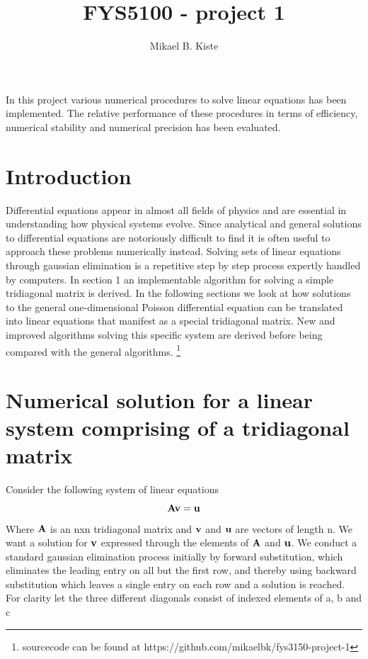 \documentclass[10pt,a4paper]{article}
\author{Mikael B. Kiste}
\title{FYS5100 - project 1}
\begin{document}
    \maketitle

    \abstract In this project various numerical procedures to solve linear equations has been implemented. The relative performance of these procedures in terms of efficiency, numerical stability and numerical precision has been evaluated.

    \tableofcontents

    \newpage
    \section{Introduction}
    Differential equations appear in almost all fields of physics and are essential in understanding how physical systems evolve. Since analytical and general solutions to differential equations are notoriously difficult to find it is often useful to approach these problems numerically instead. Solving sets of linear equations through gaussian elimination is a repetitive step by step process expertly handled by computers. In section 1 an implementable algorithm for solving a simple tridiagonal matrix is derived. In the following sections we look at how solutions to the general one-dimensional Poisson differential equation can be translated into linear equations that manifest as a special tridiagonal matrix. New and improved algorithms solving this specific system are derived before being compared with the general algorithms. \footnote{sourcecode can be found at https://github.com/mikaelbk/fys3150-project-1}

	\newpage
    \section{Numerical solution for a linear system comprising of a tridiagonal matrix}
    Consider the following system of linear equations
	$$\vb{Av} = \vb{u}$$
	Where $\vb{A}$ is an nxn tridiagonal matrix and $\vb{v}$ and $\vb{u}$ are vectors of length n.
    We want a solution for $\vb{v}$ expressed through the elements of $\vb{A}$ and $\vb{u}$.
    We conduct a standard gaussian elimination process initially by forward substitution, which eliminates the leading entry on all but the first row, and thereby using backward substitution which leaves a single entry on each row and a solution is reached. For clarity let the three different diagonals consist of indexed elements of a, b and c
\end{document}
